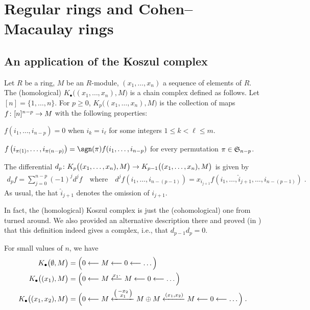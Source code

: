 \documentclass[a4paper,parskip=half,numbers=enddot, DIV=12]{scrreprt}
\begin{document}
\chapter{Regular rings and Cohen--Macaulay rings}
\section{An application of the Koszul complex}
\begin{defi}
	Let $R$ be a ring, $M$ be an $R$-module, $(x_1,\ldots,x_n)$ a sequence of elements of $R$. The (homological)  $K_\bullet\big((x_1,\ldots,x_n),M\big)$ is a chain complex defined as follows. Let $[n]=\{1,\ldots,n\}$. For $p\geq0$, $K_p\big((x_1,\ldots,x_n),M\big)$ is the collection of maps $f\colon [n]^{n-p}\morphism M$ with the following properties:
	\begin{alphanumerate}
		\item $f(i_1,\ldots,i_{n-p})=0$ when $i_k=i_\ell$ for some integers $1\leq k<\ell\leq m$.
		\item $f\left(i_{\pi(1)},\ldots,i_{\pi(n-p)}\right)=\sgn(\pi)f(i_1,\ldots,i_{n-p})$ for every permutation $\pi\in\mathfrak{S}_{n-p}$.
	\end{alphanumerate}
	The differential $d_p\colon K_p\big((x_1,\ldots,x_n),M\big)\morphism K_{p-1}\big((x_1,\ldots,x_n),M\big)$ is given by 
	\begin{align*}
	d_pf=\sum_{j=0}^{n-p}(-1)^jd^jf\quad\text{where}\quad d^ jf\left(i_1,\ldots,i_{n-(p-1)}\right)=x_{i_{j+1}}f\left(i_1,\ldots,\hat{i}_{j+1},\ldots,i_{n-(p-1)}\right)\;.
	\end{align*}
	As usual, the hat $\hat{i}_{j+1}$ denotes the omission of $i_{j+1}$.
\end{defi}
In fact, the (homological) Koszul complex is just the (cohomological) one from \cite[Definition~2.1.3]{alggeo2} turned around. We also provided an alternative description there and proved (in \cite[Remark~2.1.1]{alggeo2}) that this definition indeed gives a complex, i.e., that $d_{p-1}d_p=0$.

\begin{example}
	For small values of $n$, we have
	\begin{align*}
	K_\bullet\big(\emptyset,M\big)&=\Big(0\lmorphism M\lmorphism 0\lmorphism\ldots\Big)\\
	K_\bullet\big((x_1),M\big)&=\Big(0\lmorphism M\lmorphism[x_1\cdot] M\lmorphism 0\lmorphism\ldots\Big)\\
	K_\bullet\big((x_1,x_2),M\big)&=\Big(0\lmorphism M\xleftarrow{\left(\begin{smallmatrix}
		-x_2\\
		x_1
		\end{smallmatrix}\right)} M\oplus M\xleftarrow{(x_1,x_2)} M\lmorphism 0\lmorphism\ldots\Big)\;.
	\end{align*}
\end{example}
\end{document}
